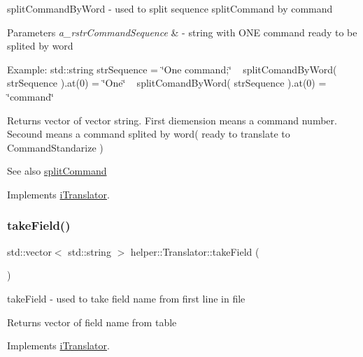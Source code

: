 split\+Command\+By\+Word -\/ used to split sequence split\+Command by command 


\begin{DoxyParams}{Parameters}
{\em a\+\_\+rstr\+Command\+Sequence} & -\/ string with O\+NE command ready to be splited by word\\
\hline
\end{DoxyParams}
Example\+: std\+::string str\+Sequence = \char`\"{}\+One command;\char`\"{} ~\newline
 split\+Comand\+By\+Word( str\+Sequence ).at(0) = \char`\"{}\+One\char`\"{} ~\newline
 split\+Comand\+By\+Word( str\+Sequence ).at(0) = \char`\"{}command\char`\"{} \begin{DoxyReturn}{Returns}
vector of vector string. First diemension means a command number. Secound means a command splited by word( ready to translate to Command\+Standarize ) 
\end{DoxyReturn}
\begin{DoxySeeAlso}{See also}
\mbox{\hyperlink{classhelper_1_1_translator_acc87c03c71d988bb0f6e95e1bff839c8}{split\+Command}} 
\end{DoxySeeAlso}


Implements \mbox{\hyperlink{classi_translator}{i\+Translator}}.

\mbox{\label{classhelper_1_1_translator_a87c4cdc109a5ab827e9b91364cb5266f}} 
\subsubsection{\texorpdfstring{takeField()}{takeField()}}
{\footnotesize\ttfamily std\+::vector$<$ std\+::string $>$ helper\+::\+Translator\+::take\+Field (\begin{DoxyParamCaption}{ }\end{DoxyParamCaption})\hspace{0.3cm}{\ttfamily [virtual]}}



take\+Field -\/ used to take field name from first line in file 

\begin{DoxyReturn}{Returns}
vector of field name from table 
\end{DoxyReturn}


Implements \mbox{\hyperlink{classi_translator}{i\+Translator}}.

